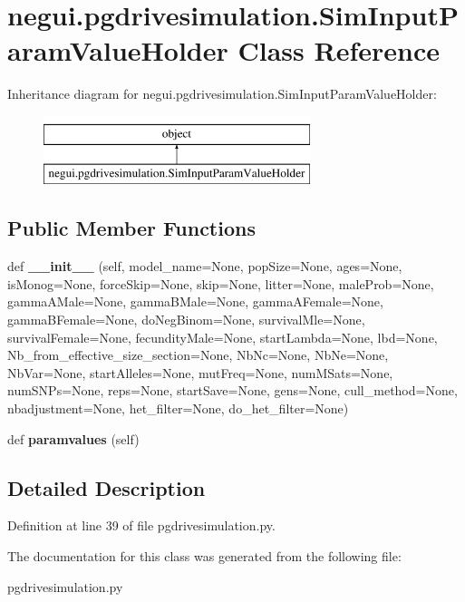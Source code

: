 \hypertarget{classnegui_1_1pgdrivesimulation_1_1SimInputParamValueHolder}{}\section{negui.\+pgdrivesimulation.\+Sim\+Input\+Param\+Value\+Holder Class Reference}
\label{classnegui_1_1pgdrivesimulation_1_1SimInputParamValueHolder}
Inheritance diagram for negui.\+pgdrivesimulation.\+Sim\+Input\+Param\+Value\+Holder\+:\begin{figure}[H]
\begin{center}
\leavevmode
\includegraphics[height=2.000000cm]{classnegui_1_1pgdrivesimulation_1_1SimInputParamValueHolder}
\end{center}
\end{figure}
\subsection*{Public Member Functions}
\begin{DoxyCompactItemize}
\item 
def {\bfseries \+\_\+\+\_\+init\+\_\+\+\_\+} (self, model\+\_\+name=None, pop\+Size=None, ages=None, is\+Monog=None, force\+Skip=None, skip=None, litter=None, male\+Prob=None, gamma\+A\+Male=None, gamma\+B\+Male=None, gamma\+A\+Female=None, gamma\+B\+Female=None, do\+Neg\+Binom=None, survival\+Mle=None, survival\+Female=None, fecundity\+Male=None, start\+Lambda=None, lbd=None, Nb\+\_\+from\+\_\+effective\+\_\+size\+\_\+section=None, Nb\+Nc=None, Nb\+Ne=None, Nb\+Var=None, start\+Alleles=None, mut\+Freq=None, num\+M\+Sats=None, num\+S\+N\+Ps=None, reps=None, start\+Save=None, gens=None, cull\+\_\+method=None, nbadjustment=None, het\+\_\+filter=None, do\+\_\+het\+\_\+filter=None)\hypertarget{classnegui_1_1pgdrivesimulation_1_1SimInputParamValueHolder_abfdbc1ca33a1f3d6fb3661c521879684}{}\label{classnegui_1_1pgdrivesimulation_1_1SimInputParamValueHolder_abfdbc1ca33a1f3d6fb3661c521879684}

\item 
def {\bfseries paramvalues} (self)\hypertarget{classnegui_1_1pgdrivesimulation_1_1SimInputParamValueHolder_a93a6d83abc4ef6d9b534eebf28adf6c3}{}\label{classnegui_1_1pgdrivesimulation_1_1SimInputParamValueHolder_a93a6d83abc4ef6d9b534eebf28adf6c3}

\end{DoxyCompactItemize}


\subsection{Detailed Description}


Definition at line 39 of file pgdrivesimulation.\+py.



The documentation for this class was generated from the following file\+:\begin{DoxyCompactItemize}
\item 
pgdrivesimulation.\+py\end{DoxyCompactItemize}

